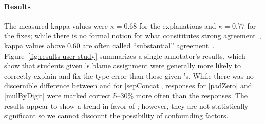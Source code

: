 \paragraph{Results}
%
The measured kappa values were $\kappa = 0.68$ for the explanations and
$\kappa = 0.77$ for the fixes; while there is no formal notion for what
consititutes strong agreement~\cite{Krippendorff2012-wd}, kappa values
above $0.60$ are often called ``substantial''
agreement~\cite{Landis1977-ey}.
%
Figure~\ref{fig:results-user-study} summarizes a single annotator's
results, which show that students given \toolname's blame assignment
were generally more likely to correctly explain and fix the type error
than those given \sherrloc's.
%
While there was no discernible difference between \toolname and
\sherrloc for |sepConcat|, \toolname responses for |padZero| and
|mulByDigit| were marked correct 5--30\% more often than the \sherrloc
responses.
%
The results appear to show a trend in favor of \toolname;
%
however, they are not statistically significant so
we cannot discount the possibility of confounding factors.
%
